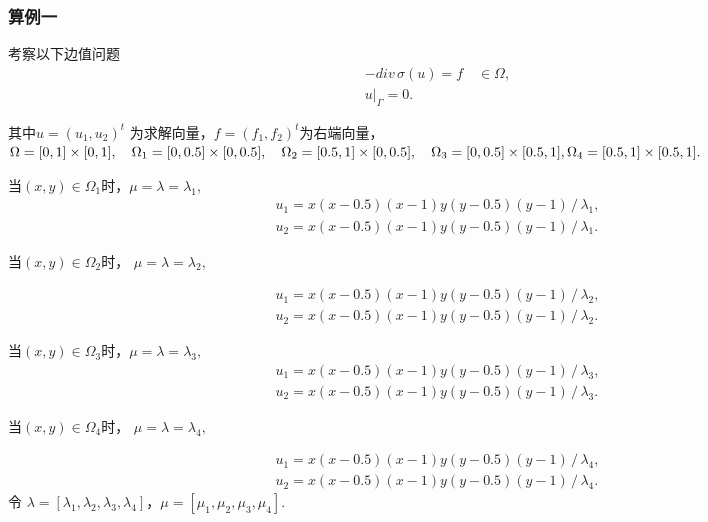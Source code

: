 \documentclass[a4paper,UTF8,titlepage,10pt]{ctexart}
\numberwithin{equation}{subsection}
\begin{document}
\subsubsection{算例一}

考察以下边值问题
$$
\begin{matrix}
	-div \, \sigma(u) = f \quad \in \Omega , \\
	u |_{\Gamma} = 0 .
\end{matrix}
$$ 
\par
其中$ u = (u_1,u_2)^t $ 为求解向量，$ f = (f_1,f_2)^t $为右端向量，
$ 
\Omega = [0,1] \times [0,1] , \quad 
\Omega_1 = [0,0.5] \times [0,0.5] , \quad
\Omega_2 = [0.5,1] \times [0,0.5], \quad
\Omega_3 = [0,0.5] \times [0.5,1], \\
\Omega_4 = [0.5,1] \times [0.5,1].
$ 
\par
当$(x,y) \in \Omega_1$时，$\mu = \lambda = \lambda_1,$
$$
\begin{matrix}
	u_1 = x (x-0.5) (x-1) y (y-0.5) (y-1) \, / \, \lambda_1 ,
	\\
	u_2 = x (x-0.5) (x-1) y (y-0.5) (y-1) \, / \, \lambda_1 .
\end{matrix}
$$

当$(x,y) \in \Omega_2$时， $\mu = \lambda = \lambda_2,$

$$
\begin{matrix}
	u_1 = x (x-0.5) (x-1) y (y-0.5) (y-1) \, / \, \lambda_2 ,
	\\
	u_2 = x (x-0.5) (x-1) y (y-0.5) (y-1) \, / \, \lambda_2 .
\end{matrix}
$$

当$(x,y) \in \Omega_3$时，$\mu = \lambda = \lambda_3,$ 
$$
\begin{matrix}
	u_1 = x (x-0.5) (x-1) y (y-0.5) (y-1) \, / \, \lambda_3 ,
	\\
	u_2 = x (x-0.5) (x-1) y (y-0.5) (y-1) \, / \, \lambda_3 .
\end{matrix}
$$

当$(x,y) \in \Omega_4$时， $\mu = \lambda = \lambda_4,$

$$
\begin{matrix}
	u_1 = x (x-0.5) (x-1) y (y-0.5) (y-1) \, / \, \lambda_4 ,
	\\
	u_2 = x (x-0.5) (x-1) y (y-0.5) (y-1) \, / \, \lambda_4 .
\end{matrix}
$$
令 $\lambda = [\lambda_1, \lambda_2, \lambda_3, \lambda_4]$，$\mu = [\mu_1, \mu_2, \mu_3, \mu_4].$ 

\clearpage
\end{document}
